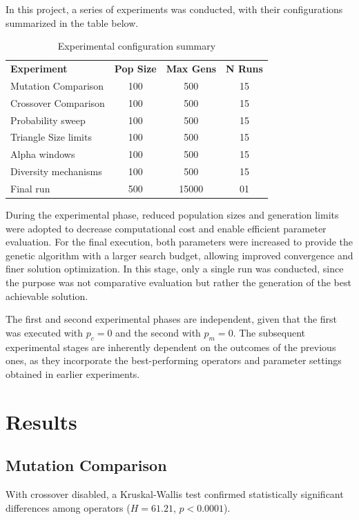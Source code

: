 \documentclass[11pt,a4paper]{article}
\newcommand{\tH}[1]{\textcolor{novagreen}{\textbf{#1}}}
\newcommand{\gmid}{\arrayrulecolor{novagreen}\midrule\arrayrulecolor{black}}
\begin{document}
In this project, a series of experiments was conducted, with their configurations summarized in the table below.

\begin{table}[h]
\centering
\begin{tabular}{lccc}
\toprule
\tH{Experiment} & \tH{Pop Size} & \tH{Max Gens} & \tH{N Runs} \\
\gmid
Mutation Comparison & 100 & 500 & 15 \\
Crossover Comparison & 100 & 500 & 15 \\
Probability sweep & 100 & 500 & 15 \\
Triangle Size limits & 100 & 500 & 15 \\
Alpha windows & 100 & 500 & 15  \\
Diversity mechanisms & 100 & 500 & 15  \\
Final run & 500 & 15000 & 01  \\
\bottomrule
\end{tabular}
\caption{Experimental configuration summary}
\end{table}

During the experimental phase, reduced population sizes and generation limits were adopted to decrease computational cost and enable efficient parameter evaluation. For the final execution, both parameters were increased to provide the genetic algorithm with a larger search budget, allowing improved convergence and finer solution optimization. In this stage, only a single run was conducted, since the purpose was not comparative evaluation but rather the generation of the best achievable solution.

The first and second experimental phases are independent, given that the first was executed with $p_c = 0$ and the second with $p_m = 0$. The subsequent experimental stages are inherently dependent on the outcomes of the previous ones, as they incorporate the best-performing operators and parameter settings obtained in earlier experiments.

\section{Results}

\subsection{Mutation Comparison}

With crossover disabled, a Kruskal-Wallis test confirmed
statistically significant differences among operators ($H = 61.21$, $p < 0.0001$).
\end{document}
